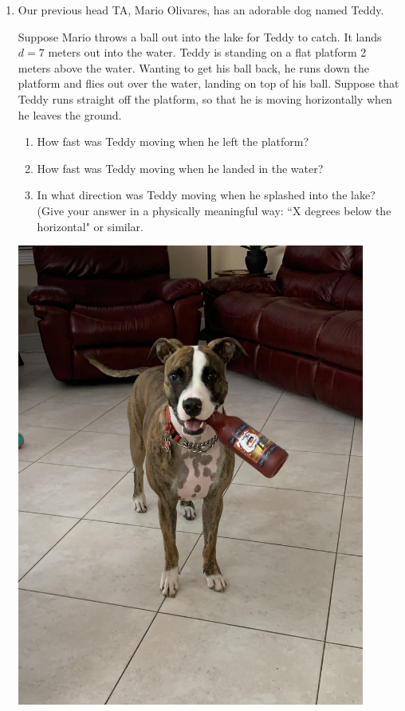 \documentclass[12pt]{article}
\begin{document}
\begin{enumerate}
\bigskip


\item Our previous head TA, Mario Olivares, has an adorable dog named Teddy. 
\bigskip

	\begin{minipage}{0.5\textwidth}

	Suppose Mario throws a ball out into the lake for Teddy to catch. It lands $d=7$ meters out into the water. Teddy is standing on a flat platform 2 meters above the water. Wanting to get his ball back, he runs down the 
		platform and flies out over the water, landing on top of his ball. Suppose that Teddy runs straight off the platform, so that he is moving horizontally when he leaves the ground.

\begin{enumerate}
\item How fast was Teddy moving when he left the platform? 
\item How fast was Teddy moving when he landed in the water?
\item In what direction was Teddy moving when he splashed into the lake? (Give your answer in a physically meaningful way: ``X degrees below the horizontal" or similar.
\end{enumerate}

	\end{minipage}
		\begin{minipage}{0.5\textwidth}
			\begin{center}
				\includegraphics[width=0.9\textwidth]{teddy.jpg}
			\end{center}
		\end{minipage}



\end{enumerate}
\end{document}
